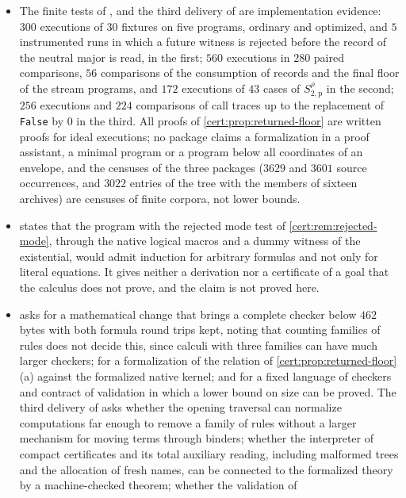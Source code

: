 \begin{itemize}
evaluate. This is the failure of a route of proof, not a theorem of nonexistence.
\item The finite tests of , 
and the third delivery of  are implementation evidence:
$300$ executions of $30$ fixtures on five programs, ordinary and optimized, and
$5$ instrumented runs in which a future witness is rejected before the record of
the neutral major is read, in the first; $560$ executions in $280$ paired
comparisons, $56$ comparisons of the consumption of records and the final floor of
the stream programs, and $172$ executions of $43$ cases of
$S^{\rho}_{2,\mathrm p}$ in the second; $256$ executions and $224$ comparisons of
call traces up to the replacement of \texttt{False} by $0$ in the third. All proofs
of \cref{cert:prop:returned-floor} are written proofs for ideal executions; no
package claims a formalization in a proof assistant, a minimal program or a
program below all coordinates of an envelope, and the censuses of the three
packages ($3629$ and $3601$ source occurrences, and $3022$ entries of the tree
with the members of sixteen archives) are censuses of finite
corpora, not lower bounds.
\item {} states that the program with the rejected mode test
of \cref{cert:rem:rejected-mode}, through the native logical macros and a dummy
witness of the existential, would admit induction for arbitrary formulas and not
only for literal equations. It gives neither a derivation nor a certificate of a
goal that the calculus does not prove, and the claim is not proved here.
\item {} asks for a mathematical change that brings
a complete checker below $462$ bytes with both formula round trips kept, noting
that counting families of rules does not decide this, since calculi with three
families can have much larger checkers; for a formalization of the relation of
\cref{cert:prop:returned-floor}(a) against the formalized native kernel; and for a
fixed language of checkers and contract of validation in which a lower bound on
size can be proved. The third delivery of  asks
whether the opening traversal can normalize computations far enough to remove a
family of rules without a larger mechanism for moving terms through binders;
whether the interpreter of compact certificates and its total auxiliary reading,
including malformed trees and the allocation of fresh names, can be connected to
the formalized theory by a machine-checked theorem; whether the validation of

\end{itemize}
